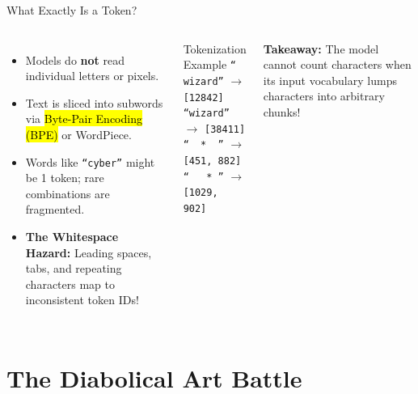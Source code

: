 \documentclass[aspectratio=169,11pt,xcolor={table,dvipsnames}]{beamer}
\begin{document}
\begin{frame}{What Exactly Is a Token?}
  \begin{columns}[T]
      \begin{itemize}
        \item Models do \textbf{not} read individual letters or pixels.
        \item Text is sliced into subwords via \hl{Byte-Pair Encoding (BPE)} or WordPiece.
        \item Words like \texttt{``cyber''} might be 1 token; rare combinations are fragmented.
        \item \textbf{The Whitespace Hazard:} Leading spaces, tabs, and repeating characters map to inconsistent token IDs!
      \end{itemize}

      \begin{exampleblock}{Tokenization Example}
        \small
        \texttt{`` wizard''} $\rightarrow$ \texttt{[12842]} \\
        \texttt{``wizard''} $\rightarrow$ \texttt{[38411]} \\
        \texttt{``\ \ *\ \ ''} $\rightarrow$ \texttt{[451, 882]} \\
        \texttt{``\ \ \ *\ ''} $\rightarrow$ \texttt{[1029, 902]}
      \end{exampleblock}
      \vspace{0.2cm}
      \footnotesize\textcolor{accentamber}{\textbf{Takeaway:}} The model cannot count characters when its input vocabulary lumps characters into arbitrary chunks!
  \end{columns}
\end{frame}

\section{The Diabolical Art Battle}
\end{document}

